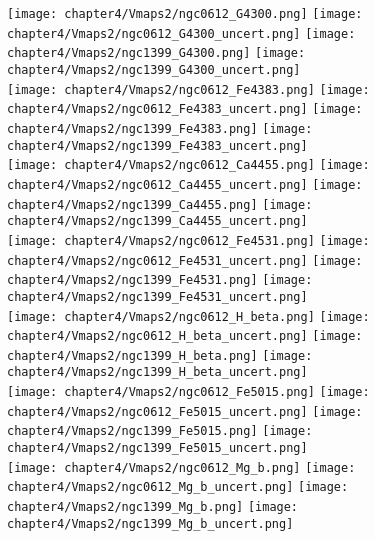 \begin{figure*}
	\centering
	\texttt{[image: chapter4/Vmaps2/ngc0612\_G4300.png]}
	\texttt{[image: chapter4/Vmaps2/ngc0612\_G4300\_uncert.png]}
	\texttt{[image: chapter4/Vmaps2/ngc1399\_G4300.png]}
	\texttt{[image: chapter4/Vmaps2/ngc1399\_G4300\_uncert.png]}
	\\
	\texttt{[image: chapter4/Vmaps2/ngc0612\_Fe4383.png]}
	\texttt{[image: chapter4/Vmaps2/ngc0612\_Fe4383\_uncert.png]}
	\texttt{[image: chapter4/Vmaps2/ngc1399\_Fe4383.png]}
	\texttt{[image: chapter4/Vmaps2/ngc1399\_Fe4383\_uncert.png]}
	\\
	\texttt{[image: chapter4/Vmaps2/ngc0612\_Ca4455.png]}
	\texttt{[image: chapter4/Vmaps2/ngc0612\_Ca4455\_uncert.png]}
	\texttt{[image: chapter4/Vmaps2/ngc1399\_Ca4455.png]}
	\texttt{[image: chapter4/Vmaps2/ngc1399\_Ca4455\_uncert.png]}
	\\
	\texttt{[image: chapter4/Vmaps2/ngc0612\_Fe4531.png]}
	\texttt{[image: chapter4/Vmaps2/ngc0612\_Fe4531\_uncert.png]}
	\texttt{[image: chapter4/Vmaps2/ngc1399\_Fe4531.png]}
	\texttt{[image: chapter4/Vmaps2/ngc1399\_Fe4531\_uncert.png]}
	\\
	\texttt{[image: chapter4/Vmaps2/ngc0612\_H\_beta.png]}
	\texttt{[image: chapter4/Vmaps2/ngc0612\_H\_beta\_uncert.png]}
	\texttt{[image: chapter4/Vmaps2/ngc1399\_H\_beta.png]}
	\texttt{[image: chapter4/Vmaps2/ngc1399\_H\_beta\_uncert.png]}
	\\
	\texttt{[image: chapter4/Vmaps2/ngc0612\_Fe5015.png]}
	\texttt{[image: chapter4/Vmaps2/ngc0612\_Fe5015\_uncert.png]}
	\texttt{[image: chapter4/Vmaps2/ngc1399\_Fe5015.png]}
	\texttt{[image: chapter4/Vmaps2/ngc1399\_Fe5015\_uncert.png]}
	\\
	\texttt{[image: chapter4/Vmaps2/ngc0612\_Mg\_b.png]}
	\texttt{[image: chapter4/Vmaps2/ngc0612\_Mg\_b\_uncert.png]}
	\texttt{[image: chapter4/Vmaps2/ngc1399\_Mg\_b.png]}
	\texttt{[image: chapter4/Vmaps2/ngc1399\_Mg\_b\_uncert.png]}
	\\
\end{figure*}

